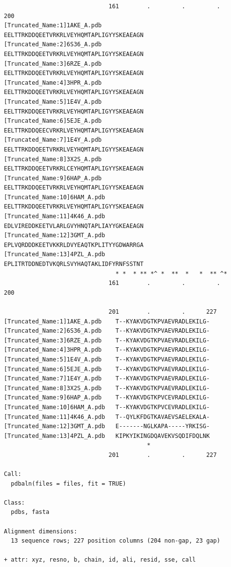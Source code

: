 \documentclass[
  letterpaper,
  DIV=11,
  numbers=noendperiod]{scrartcl}
\begin{document}
\begin{verbatim}
                              161        .         .         .         200 
[Truncated_Name:1]1AKE_A.pdb    EELTTRKDDQEETVRKRLVEYHQMTAPLIGYYSKEAEAGN
[Truncated_Name:2]6S36_A.pdb    EELTTRKDDQEETVRKRLVEYHQMTAPLIGYYSKEAEAGN
[Truncated_Name:3]6RZE_A.pdb    EELTTRKDDQEETVRKRLVEYHQMTAPLIGYYSKEAEAGN
[Truncated_Name:4]3HPR_A.pdb    EELTTRKDDQEETVRKRLVEYHQMTAPLIGYYSKEAEAGN
[Truncated_Name:5]1E4V_A.pdb    EELTTRKDDQEETVRKRLVEYHQMTAPLIGYYSKEAEAGN
[Truncated_Name:6]5EJE_A.pdb    EELTTRKDDQEECVRKRLVEYHQMTAPLIGYYSKEAEAGN
[Truncated_Name:7]1E4Y_A.pdb    EELTTRKDDQEETVRKRLVEYHQMTAPLIGYYSKEAEAGN
[Truncated_Name:8]3X2S_A.pdb    EELTTRKDDQEETVRKRLCEYHQMTAPLIGYYSKEAEAGN
[Truncated_Name:9]6HAP_A.pdb    EELTTRKDDQEETVRKRLVEYHQMTAPLIGYYSKEAEAGN
[Truncated_Name:10]6HAM_A.pdb   EELTTRKDDQEETVRKRLVEYHQMTAPLIGYYSKEAEAGN
[Truncated_Name:11]4K46_A.pdb   EDLVIREDDKEETVLARLGVYHNQTAPLIAYYGKEAEAGN
[Truncated_Name:12]3GMT_A.pdb   EPLVQRDDDKEETVKKRLDVYEAQTKPLITYYGDWARRGA
[Truncated_Name:13]4PZL_A.pdb   EPLITRTDDNEDTVKQRLSVYHAQTAKLIDFYRNFSSTNT
                                * *  * ** *^ *  **  *   *  ** ^*         
                              161        .         .         .         200 

                              201        .         .      227 
[Truncated_Name:1]1AKE_A.pdb    T--KYAKVDGTKPVAEVRADLEKILG-
[Truncated_Name:2]6S36_A.pdb    T--KYAKVDGTKPVAEVRADLEKILG-
[Truncated_Name:3]6RZE_A.pdb    T--KYAKVDGTKPVAEVRADLEKILG-
[Truncated_Name:4]3HPR_A.pdb    T--KYAKVDGTKPVAEVRADLEKILG-
[Truncated_Name:5]1E4V_A.pdb    T--KYAKVDGTKPVAEVRADLEKILG-
[Truncated_Name:6]5EJE_A.pdb    T--KYAKVDGTKPVAEVRADLEKILG-
[Truncated_Name:7]1E4Y_A.pdb    T--KYAKVDGTKPVAEVRADLEKILG-
[Truncated_Name:8]3X2S_A.pdb    T--KYAKVDGTKPVAEVRADLEKILG-
[Truncated_Name:9]6HAP_A.pdb    T--KYAKVDGTKPVCEVRADLEKILG-
[Truncated_Name:10]6HAM_A.pdb   T--KYAKVDGTKPVCEVRADLEKILG-
[Truncated_Name:11]4K46_A.pdb   T--QYLKFDGTKAVAEVSAELEKALA-
[Truncated_Name:12]3GMT_A.pdb   E-------NGLKAPA-----YRKISG-
[Truncated_Name:13]4PZL_A.pdb   KIPKYIKINGDQAVEKVSQDIFDQLNK
                                         *                  
                              201        .         .      227 

Call:
  pdbaln(files = files, fit = TRUE)

Class:
  pdbs, fasta

Alignment dimensions:
  13 sequence rows; 227 position columns (204 non-gap, 23 gap) 

+ attr: xyz, resno, b, chain, id, ali, resid, sse, call
\end{verbatim}
\end{document}
